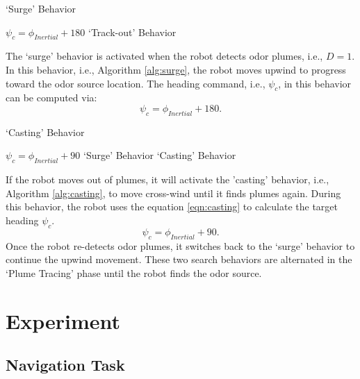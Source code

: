 \begin{algorithm}[h!]
\caption{`Surge' Behavior}\label{alg:surge}
\begin{algorithmic}[1]
    \State $\psi_{c}=\phi_{Inertial}+180$
        \State \Return `Track-out' Behavior
    \EndIf
\EndIf
\end{algorithmic}
\end{algorithm}

The `surge' behavior is activated when the robot detects odor plumes, i.e., $D=1$. In this behavior, i.e., Algorithm \ref{alg:surge}, the robot moves upwind to progress toward the odor source location. The heading command, i.e., $\psi_c$, in this behavior can be computed via:
\begin{equation}
    \psi_{c}=\phi_{Inertial}+180.
    \label{eqn:surge}
\end{equation}

\begin{algorithm}[h]
\caption{`Casting' Behavior}\label{alg:casting}
\begin{algorithmic}[1]
    \State $\psi_{c}=\phi_{Inertial}+90$
        \State \Return `Surge' Behavior
    \Else
        \State \Return `Casting' Behavior
    \EndIf
\EndIf
\end{algorithmic}
\end{algorithm}

If the robot moves out of plumes, it will activate the 'casting' behavior, i.e., Algorithm \ref{alg:casting}, to move cross-wind until it finds plumes again. During this behavior, the robot uses the equation \ref{eqn:casting} to calculate the target heading $\psi_{c}$.
\begin{equation}
    \psi_{c}=\phi_{Inertial}+90.
    \label{eqn:casting}
\end{equation}
Once the robot re-detects odor plumes, it switches back to the `surge' behavior to continue the upwind movement. These two search behaviors are alternated in the `Plume Tracing' phase until the robot finds the odor source. 

\section{Experiment}\label{Sec:olfactionExperiment}
\subsection{Navigation Task}\label{Subsec:fusionNavigationTask}

